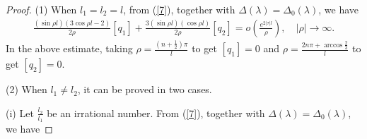 \documentclass[reqno,11pt,centertags]{amsart}
\numberwithin{equation}{section}
\theoremstyle{definition}
\begin{document}
\begin{proof}
(1) When $l_{1}=l_{2}=l$, from (\ref{7}), together with $\Delta(\lambda)=\Delta_{0}(\lambda)$, we have
\begin{align}
\frac{(\sin\rho l)(3\cos\rho l-2)}{2\rho}[q_{1}]+\frac{3(\sin\rho l)(\cos\rho l)}{2\rho}[q_{2}]
 =o\left(\frac{e^{2|\tau|l}}{\rho}\right),\quad |\rho|\rightarrow\infty. \nonumber
\end{align}
In the above estimate, taking $\rho=\frac{(n+\frac{1}{2})\pi}{l}$  to get $[q_{1}]=0$ and $\rho=\frac{2n\pi+\arccos\frac{2}{3}}{l}$  to get $[q_{2}]=0$.

(2) When $l_{1}\neq l_{2}$, it can be proved in two cases.

(i) Let $\frac{l_{2}}{l_{1}}$ be an irrational number. From (\ref{7}), together with $\Delta(\lambda)=\Delta_{0}(\lambda)$, we have


\end{proof}
\end{document}
